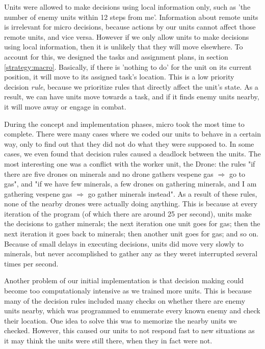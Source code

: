 Units were allowed to make decisions using local information only, such as 'the number of enemy units within 12 steps from me'. Information about remote units is irrelevant for micro decisions, because actions by our units cannot affect those remote units, and vice versa. However if we only allow units to make decisions using local information, then it is unlikely that they will move elsewhere. To account for this, we designed the tasks and assignment plans, in section \ref{strategy:macro}. Basically, if there is 'nothing to do' for the unit on its current position, it will move to its assigned task's location. This is a low priority decision \emph{rule}, because we prioritize rules that directly affect the unit's state. As a result, we can have units move towards a task, and if it finds enemy units nearby, it will move away or engage in combat.

During the concept and implementation phases, micro took the most time to complete. There were many cases where we coded our units to behave in a certain way, only to find out that they did not do what they were supposed to. In some cases, we even found that decision rules caused a deadlock between the units. The most interesting one was a conflict with the worker unit, the Drone: the rules "if there are five drones on minerals and no drone gathers vespene gas $\Rightarrow$ go to gas", and "if we have few minerals, a few drones on gathering minerals, and I am gathering vespene gas $\Rightarrow$ go gather minerals instead". As a result of these rules, none of the nearby drones were actually doing anything. This is because at every iteration of the program (of which there are around 25 per second), units make the decisions to gather minerals; the next iteration one unit goes for gas; then the next iteration it goes back to minerals; then another unit goes for gas; and so on. Because of small delays in executing decisions, units did move very slowly to minerals, but never accomplished to gather any as they weret interrupted several times per second.

Another problem of our initial implementation is that decision making could become too computationaly intensive as we trained more units. This is because many of the decision rules included many checks on whether there are enemy units nearby, which was programmed to enumerate every known enemy and check their location. One idea to solve this was to memorize the nearby units we checked. However, this caused our units to not respond fast to new situations as it may think the units were still there, when they in fact were not.

